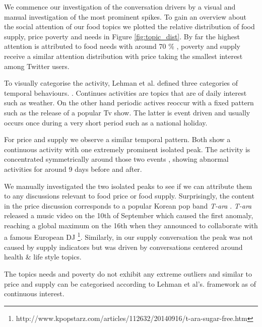 We commence our investigation of the conversation drivers by a visual and manual investigation of the most prominent spikes. To gain an overview about the social attention of our food topics we plotted the relative distribution of food supply, price poverty and needs in Figure \ref{fig:topic_dist}. By far the highest attention is attributed to food needs with around 70 \% , poverty and supply receive a similar attention distribution with price taking the smallest interest among Twitter users. 

To visually categorise the activity, Lehman et al. \cite{Lehmann2012} defined three categories of temporal behaviours. . Continues activities are topics that are of daily interest such as weather. On the other hand periodic actives reoccur with a fixed pattern such as the release of a popular Tv show. The latter is event driven and usually occurs once during a very short period such as a national holiday. 

For price and supply we observe a similar temporal pattern. Both show a continuous activity with one extremely prominent isolated peak. The activity is concentrated symmetrically around those two events , showing abnormal activities for around 9 days before and after. 

 We manually investigated the two isolated peaks to see if we can attribute them to any discussions relevant to food price or food supply. Surprisingly, the content in the price discussion corresponds to a popular Korean pop band \emph{T-ara }. \emph{T-ara } released a music video on the 10th of September which caused the first anomaly, reaching a global maximum on the 16th when they announced to collaborate with a famous European DJ  \footnote{http://www.kpopstarz.com/articles/112632/20140916/t-ara-sugar-free.htm}. Similarly, in our supply conversation the peak was not caused by supply indicators but was driven by conversations centered around health \& life style topics. 

The topics needs and poverty do not exhibit any extreme outliers and similar to price and supply can be categorised according to Lehman et al's. framework as of continuous interest. 




